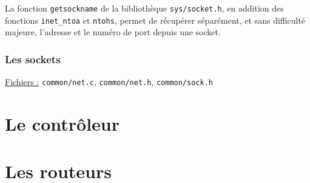 \documentclass[a4paper,11pt]{article}
\begin{document}
La fonction \texttt{getsockname} de la bibliothèque \texttt{sys/socket.h}, en addition des fonctions \texttt{inet\_ntoa} et \texttt{ntohs}, permet de récupérer séparément, et sans difficulté majeure, l'adresse et le numéro de port depuis une socket.

\subsubsection{Les sockets}

\underline{Fichiers :} \texttt{common/net.c}, \texttt{common/net.h}, \texttt{common/sock.h}\\


\section{Le contrôleur}


\section{Les routeurs}
\end{document}
